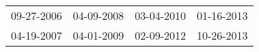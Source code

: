 \begin{supertabular}{llll}
 09-27-2006 &  04-09-2008 &  03-04-2010 &  01-16-2013 \\
 04-19-2007 &  04-01-2009 &  02-09-2012 &  10-26-2013 \\
\end{supertabular}
